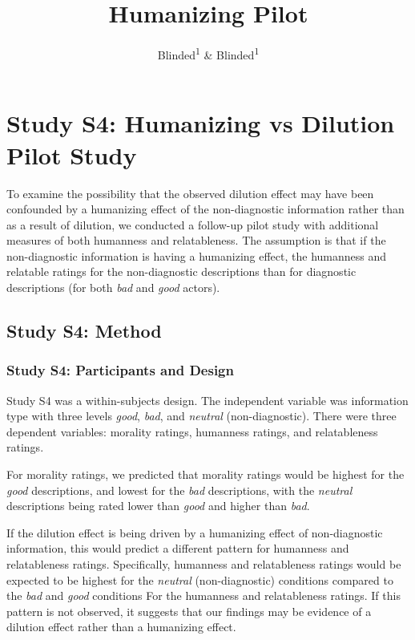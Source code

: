 \documentclass[
  man,floatsintext]{apa6}
\title{Humanizing Pilot}
\author{Blinded\textsuperscript{1} \& Blinded\textsuperscript{1}}
\date{}
\affiliation{\vspace{0.5cm}\textsuperscript{1} Blinded}
\begin{document}
\maketitle

\section{Study S4: Humanizing vs Dilution Pilot Study}\label{study-s4-humanizing-vs-dilution-pilot-study}

To examine the possibility that the observed dilution effect may have been confounded by a humanizing effect of the non-diagnostic information rather than as a result of dilution, we conducted a follow-up pilot study with additional measures of both humanness and relatableness. The assumption is that if the non-diagnostic information is having a humanizing effect, the humanness and relatable ratings for the non-diagnostic descriptions than for diagnostic descriptions (for both \emph{bad} and \emph{good} actors).

\subsection{Study S4: Method}\label{study-s4-method}

\subsubsection{Study S4: Participants and Design}\label{study-s4-participants-and-design}

Study S4 was a within-subjects design. The independent variable was information type with three levels
\emph{good}, \emph{bad}, and \emph{neutral} (non-diagnostic). There were three dependent variables: morality ratings, humanness ratings, and relatableness ratings.

For morality ratings, we predicted that morality ratings would be highest for the \emph{good} descriptions, and lowest for the \emph{bad} descriptions, with the \emph{neutral} descriptions being rated lower than \emph{good} and higher than \emph{bad}.

If the dilution effect is being driven by a humanizing effect of non-diagnostic information, this would predict a different pattern for humanness and relatableness ratings. Specifically, humanness and relatableness ratings would be expected to be highest for the \emph{neutral} (non-diagnostic) conditions compared to the \emph{bad} and \emph{good} conditions For the humanness and relatableness ratings. If this pattern is not observed, it suggests that our findings may be evidence of a dilution effect rather than a humanizing effect.
\end{document}
